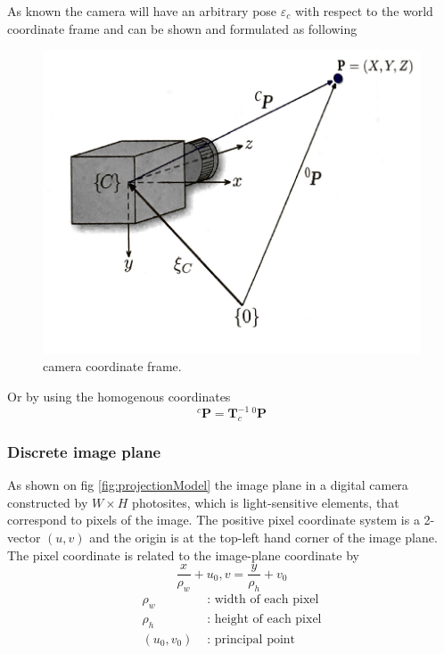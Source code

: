 \documentclass[journal,final,a4paper,twoside]{PS}
\begin{document}
As known the camera will have an arbitrary pose $\varepsilon_c$ with respect to the world coordinate frame and can be shown and formulated as following 
\begin{figure}[h]
\begin{center}
\includegraphics[scale=0.5]{./pics/cameraCoordinateFrame.png}
\caption{camera coordinate frame\cite{Corke}.}
\label{fig:cameraFrame}
\end{center}
\end{figure}

Or by using the homogenous coordinates 
\begin{equation}
{}^{c}\textbf{P}=\textbf{T}_c^{-1}\, {}^{0}\textbf{P}
\end{equation}

\subsubsection{Discrete image plane}
As shown on fig \ref{fig:projectionModel} the image plane in a digital camera constructed by $ W\times H $ photosites, which is light-sensitive elements, that correspond to pixels of the image.  The positive pixel coordinate system is a 2-vector $(u,v)$ and the origin is at the top-left hand corner of the image plane.
The pixel coordinate is related to the image-plane coordinate by
\begin{equation}\frac{x}{\rho_w} + u_0, v = \frac{y}{\rho_h}+v_0\end{equation}
\begin{align*}
\rho_w&\text{ :  width of each pixel}\\
\rho_h&\text{  :  height of each pixel}\\
(u_0,v_0)&\text{  :  principal point}
\end{align*}
\end{document}
